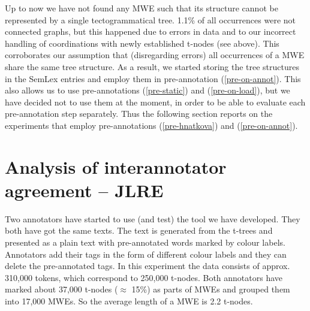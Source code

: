 

Up to now we have not found any MWE such that its structure cannot be represented by a single tectogrammatical tree. 1.1\% of all occurrences were not connected graphs, but this happened due to errors in data and to our incorrect handling of coordinations with newly established t-nodes (see above). This corroborates our assumption that (disregarding errors) all occurrences of a MWE share the same tree structure. As a result, we started storing the tree structures in the SemLex entries and employ them in pre-annotation (\ref{pre-on-annot}). This also allows us to use pre-annotations (\ref{pre-static}) and (\ref{pre-on-load}), but we have decided not to use them at the moment, in order to be able to evaluate each pre-annotation step separately. Thus the following section reports on the experiments that employ pre-annotations (\ref{pre-hnatkova}) and (\ref{pre-on-annot}).


\section{Analysis of interannotator agreement – JLRE}
\label{sec:annot:analysis}
Two annotators have started to use (and test) the tool we have developed.
They both have got the same texts. The text is generated from the t-trees and presented as a plain text with pre-annotated words mark\-ed by colour labels. Annotators add their tags in the form of different colour labels and they can delete the pre-annotated tags. 
In this experiment the data consists of approx. 310,000 tokens, which correspond to 250,000 t-nodes.
Both annotators have marked about 37,000 t-nodes ($\approx$ 15\%) as parts of MWEs and grouped them into 17,000 MWEs. So the average length of a MWE is 2.2 t-nodes.

